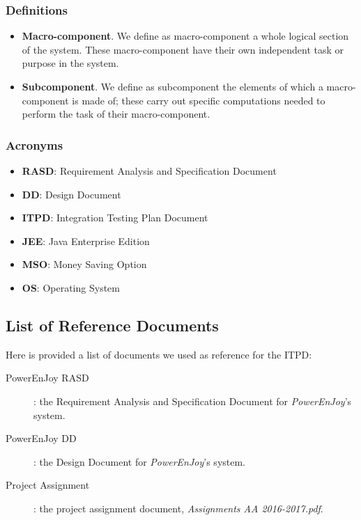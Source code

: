 	\subsubsection{Definitions}
		\begin{itemize}
			\item \textbf{Macro-component}. We define as macro-component a whole logical section of the system. These macro-component have their own independent task or purpose in the system. %
			\item \textbf{Subcomponent}. We define as subcomponent the elements of which a macro-component is made of; these carry out specific computations needed to perform the task of their macro-component.
		\end{itemize}
	\subsubsection{Acronyms}
		\begin{itemize}
			\item \textbf{RASD}: Requirement Analysis and Specification Document
			\item \textbf{DD}: Design Document
			\item \textbf{ITPD}: Integration Testing Plan Document
			\item \textbf{JEE}: Java Enterprise Edition
			\item \textbf{MSO}: Money Saving Option
			\item \textbf{OS}: Operating System
		\end{itemize}			
	
	

\subsection{List of Reference Documents}
	Here is provided a list of documents we used as reference for the ITPD:
	
	\begin{description}
		\item[PowerEnJoy RASD]: the Requirement Analysis and Specification Document for \textit{PowerEnJoy}'s system.
		\item[PowerEnJoy DD]: the Design Document for \textit{PowerEnJoy}'s system.
		\item[Project Assignment]: the project assignment document, \textit{Assignments AA 2016-2017.pdf}.
	\end{description}

